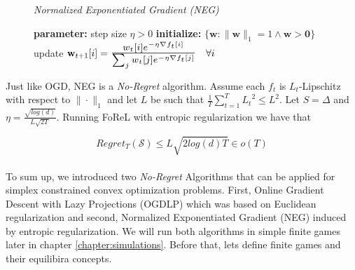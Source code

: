 \begin{figure}[H]\centering
    \textit{Normalized Exponentiated Gradient (NEG)}
    \begin{minipage}{.7\linewidth}
        \begin{algorithm}[H]
        \DontPrintSemicolon
        \textbf{parameter: } step size $\eta > 0$ \;
        \textbf{initialize: } $\{\textbf{w}: \|\textbf{w}\|_1 = 1 \land \textbf{w} > \textbf{0}\}$ \; 
         { 
        update $\textbf{w}_{t+1}[i] = \scaleto{\frac{w_t[i]e^{-\eta\nabla f_t[i]}}{\sum_{j}w_t[j]e^{-\eta\nabla f_t[j]}}}{27pt} \quad \forall i$ \;
        }
        \end{algorithm}\caption*{}
  \end{minipage}
\end{figure}

Just like OGD, NEG is a \textit{No-Regret} algorithm. Assume each $f_t$ is $L_t$-Lipschitz with respect to $\|\cdot\|_1$ and let $L$ be such that $\frac{1}{T}\sum_{t=1}^{T}{L_t}^2\le L^2$. Let $S = \Delta$ and $\eta = \frac{\sqrt{log(d)}}{L\sqrt{2T}}$. Running FoReL with entropic regularization we have that \cite[Cor. 2.14]{shalev}

\begin{equation}\label{EntropicNoRegret}
    Regret_T(\mathcal{S}) \le L\sqrt{2log(d)T} \in o(T)
\end{equation} \\

To sum up, we introduced two \textit{No-Regret} Algorithms that can be applied for simplex constrained convex optimization problems. First, Online Gradient Descent with Lazy Projections (OGDLP) which was based on Euclidean regularization and second, Normalized Exponentiated Gradient (NEG) induced by entropic regularization. We will run both algorithms in simple finite games later in chapter \ref{chapter:simulations}. Before that, lets define finite games and their equilibira concepts. 

